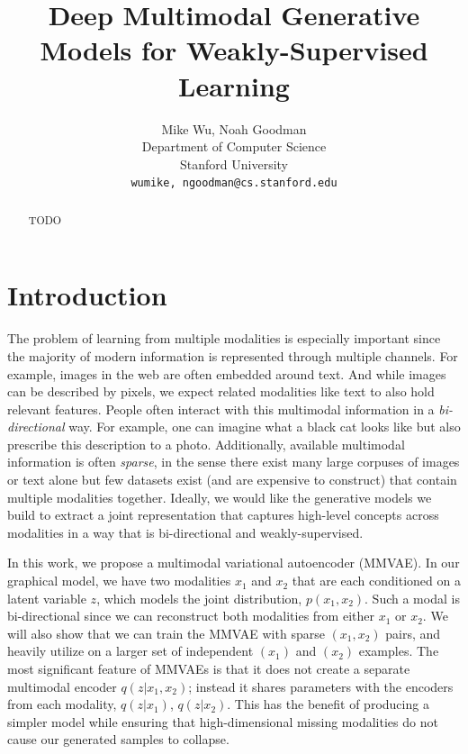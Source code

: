 \documentclass{article}
\title{Deep Multimodal Generative Models for Weakly-Supervised Learning}
\author{
    Mike Wu, Noah Goodman \\
    Department of Computer Science \\
    Stanford University \\
    \texttt{{wumike, ngoodman}@cs.stanford.edu} \\
}
\begin{document}
\maketitle

\begin{abstract}
TODO
\end{abstract}

\section{Introduction}
The problem of learning from multiple modalities is especially important since the majority of modern information is represented through multiple channels. For example, images in the web are often embedded around text. And while images can be described by pixels, we expect related modalities like text to also hold relevant features. People often interact with this multimodal information in a \textit{bi-directional} way. For example, one can imagine what a black cat looks like but also prescribe this description to a photo. Additionally, available multimodal information is often \textit{sparse}, in the sense there exist many large corpuses of images or text alone but few datasets exist (and are expensive to construct) that contain multiple modalities together. Ideally, we would like the generative models we build to extract a joint representation that captures high-level concepts across modalities in a way that is bi-directional and weakly-supervised. 

In this work, we propose a multimodal variational autoencoder (MMVAE). In our graphical model, we have two modalities $x_{1}$ and $x_{2}$ that are each conditioned on a latent variable $z$, which models the joint distribution, $p(x_{1}, x_{2})$. Such a modal is bi-directional since we can reconstruct both modalities from either $x_{1}$ or $x_{2}$. We will also show that we can train the MMVAE with sparse $(x_{1}, x_{2})$ pairs, and heavily utilize on a larger set of independent $(x_{1})$ and $(x_{2})$ examples. The most significant feature of MMVAEs is that it does not create a separate multimodal encoder $q(z | x_{1}, x_{2})$; instead it shares parameters with the encoders from each modality, $q(z | x_{1})$, $q(z | x_{2})$. This has the benefit of producing a simpler model while ensuring that high-dimensional missing modalities do not cause our generated samples to collapse.
\end{document}
